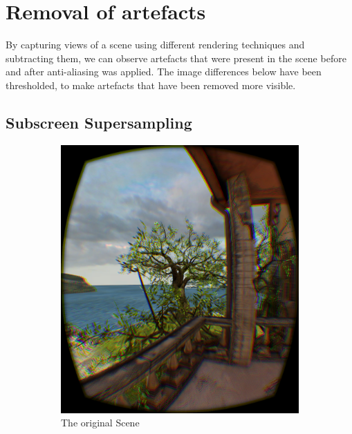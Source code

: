 \documentclass[12pt,a4paper,twoside,openright]{report}
\begin{document}
\clearpage
\section{Removal of artefacts}\label{removeArtefacts}
By capturing views of a scene using different rendering techniques and subtracting them, we can observe artefacts that were present in the scene before and after anti-aliasing was applied. The image differences below have been thresholded, to make artefacts that have been removed more visible. 

\subsection{Subscreen Supersampling}

\begin{figure}
\begin{subfigure}{0.5\textwidth}
\includegraphics[width=0.9\linewidth]{figs/tree_msaa.png}
\caption{The original Scene}
\label{fig:subim2}
\end{subfigure}
\begin{subfigure}{0.5\textwidth}

\end{subfigure}
\end{figure}
\end{document}
